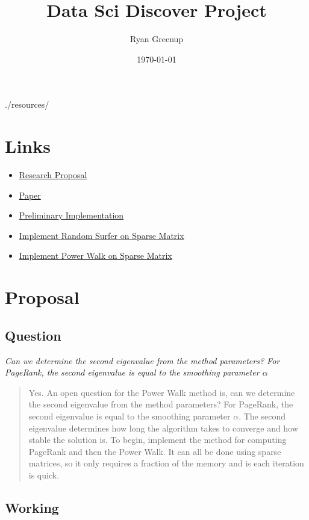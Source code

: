 \documentclass[11pt]{article}
\author{Ryan Greenup}
\date{\today}
\title{Data Sci Discover Project}
\begin{document}
\maketitle
\tableofcontents

./resources/

\section{Links}
\label{sec:org8a02152}
\begin{itemize}
\item \href{Proposal/Propsal.org}{Research Proposal}
\item \href{laparkPowerWalk2013.pdf}{Paper}
\item \href{ImplementingPageRank/01PageRank.Rmd}{Preliminary Implementation}
\item \href{ImplementingPageRank/01PageRank.R}{Implement Random Surfer on Sparse Matrix}
\item \href{ImplementingPowerWalk/01PowerWalk.R}{Implement Power Walk on Sparse Matrix}
\end{itemize}
\section{Proposal}
\label{sec:org0a1d3a3}
\subsection{Question}
\label{sec:org14db221}

\emph{Can we determine the second eigenvalue from the method parameters? For PageRank, the second eigenvalue is equal to the smoothing parameter \(\alpha\)}

\begin{quote}
Yes. An open question for the Power Walk method is, can we determine the second eigenvalue from the method parameters? For PageRank, the second eigenvalue is equal to the smoothing parameter \(\alpha\). The second eigenvalue determines how long the algorithm takes to converge and how stable the solution is.
To begin, implement the method for computing PageRank and then the Power Walk. It can all be done using sparse matrices, so it only requires a fraction of the memory and is each iteration is quick.
\end{quote}

\subsection{Working}
\label{sec:org7ea95aa}
\end{document}
